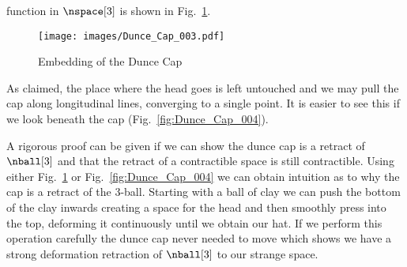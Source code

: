 \documentclass{book}                                                           %
\begin{document}
                function in $\nspace[3]$ is shown in
                Fig.~\ref{fig:Dunce_Cap_003}.
                \begin{figure}
                    \centering
                    \captionsetup{type=figure}
                    \texttt{[image: images/Dunce\_Cap\_003.pdf]}
                    \caption{Embedding of the Dunce Cap}
                    \label{fig:Dunce_Cap_003}
                \end{figure}
                As claimed, the place where the head goes is left untouched and
                we may pull the cap along longitudinal lines, converging to a
                single point. It is easier to see this if we look beneath the
                cap (Fig.~\ref{fig:Dunce_Cap_004}).
                \par\hfill\par
                \hfill
                \begin{minipage}[c]{0.54\textwidth}
                    A rigorous proof can be given if we can show the dunce cap
                    is a retract of $\nball[3]$ and that the retract of a
                    contractible space is still contractible. Using either
                    Fig.~\ref{fig:Dunce_Cap_003} or Fig.~\ref{fig:Dunce_Cap_004}
                    we can obtain intuition as to why the cap is a retract of
                    the 3-ball. Starting with a ball of clay we can push the
                    bottom of the clay inwards creating a space for the head and
                    then smoothly press into the top, deforming it
                    continuously until we obtain our hat. If we perform this
                    operation carefully the dunce cap never needed to move
                    which shows we have a strong deformation retraction of
                    $\nball[3]$ to our strange space.
                \end{minipage}
\end{document}
